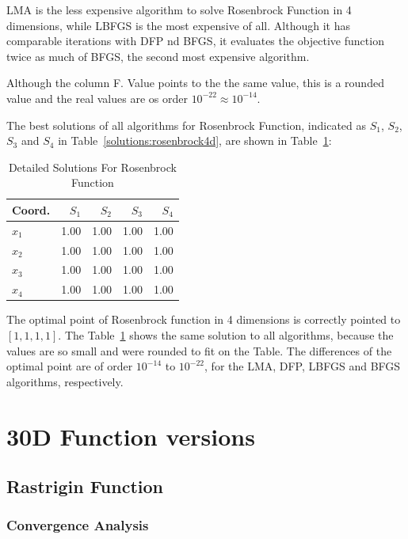\documentclass[conference]{IEEEtran}
\begin{document}
LMA is the less expensive algorithm to solve Rosenbrock Function in 4 dimensions, while LBFGS
is the most expensive of all. Although it has comparable iterations with DFP nd BFGS, it evaluates
the objective function twice as much of BFGS, the second most expensive algorithm.

Although the column F. Value points to the the same value, this is a rounded value
and the real values are os order $10^{-22} \approx 10^{-14}$.


The best solutions of all algorithms for Rosenbrock Function, indicated as
$S_{1}$, $S_{2}$, $S_{3}$ and $S_{4}$ in Table~\ref{solutions:rosenbrock4d}, are shown
in Table~\ref{detailedsolutions:rosenbrock4d}:

\begin{table}[H]
\centering
\caption{Detailed Solutions For Rosenbrock Function}
\label{detailedsolutions:rosenbrock4d}
\begin{tabular}{lrrrr}
\toprule
 Coord. &  $S_{1}$ &  $S_{2}$ &  $S_{3}$ &  $S_{4}$ \\
\midrule
$x_{1}$ &     1.00 &     1.00 &     1.00 &     1.00 \\
$x_{2}$ &     1.00 &     1.00 &     1.00 &     1.00 \\
$x_{3}$ &     1.00 &     1.00 &     1.00 &     1.00 \\
$x_{4}$ &     1.00 &     1.00 &     1.00 &     1.00 \\
\bottomrule
\end{tabular}
\end{table}

The optimal point of Rosenbrock function in 4 dimensions is correctly pointed to $\left[1, 1, 1, 1\right]$. The Table~\ref{detailedsolutions:rosenbrock4d}
shows the same solution to all algorithms, because the values are so small and were rounded to fit on the Table. The differences of
the optimal point are of order $10^{-14}$ to $10^{-22}$, for the LMA, DFP, LBFGS and BFGS algorithms, respectively.

\section{30D Function versions}
\label{functions30D}

\subsection{Rastrigin Function}
\label{rastrigin30d30D}

\subsubsection{Convergence Analysis}
\label{convergencerastrigin30d30D}
\end{document}
